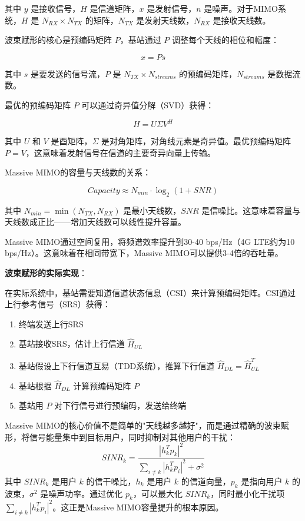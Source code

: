 其中 $y$ 是接收信号，$H$ 是信道矩阵，$x$ 是发射信号，$n$ 是噪声。对于MIMO系统，$H$ 是 $N_{RX} \times N_{TX}$ 的矩阵，$N_{TX}$ 是发射天线数，$N_{RX}$ 是接收天线数。

波束赋形的核心是预编码矩阵 $P$，基站通过 $P$ 调整每个天线的相位和幅度：

\begin{equation}
x = Ps
\end{equation}

其中 $s$ 是要发送的信号流，$P$ 是 $N_{TX} \times N_{streams}$ 的预编码矩阵，$N_{streams}$ 是数据流数。

最优的预编码矩阵 $P$ 可以通过奇异值分解（SVD）获得：

\begin{equation}
H = U\Sigma V^H
\end{equation}

其中 $U$ 和 $V$ 是酉矩阵，$\Sigma$ 是对角矩阵，对角线元素是奇异值。最优预编码矩阵 $P = V$，这意味着发射信号在信道的主要奇异向量上传输。

Massive MIMO的容量与天线数的关系：

\begin{equation}
Capacity \approx N_{min} \cdot \log_2(1 + SNR)
\end{equation}

其中 $N_{min} = \min(N_{TX}, N_{RX})$ 是最小天线数，$SNR$ 是信噪比。这意味着容量与天线数成正比——增加天线数可以线性提升容量。

Massive MIMO通过空间复用，将频谱效率提升到30-40 bps/Hz（4G LTE约为10 bps/Hz）。这意味着在相同带宽下，Massive MIMO可以提供3-4倍的吞吐量。

\textbf{波束赋形的实际实现}：

在实际系统中，基站需要知道信道状态信息（CSI）来计算预编码矩阵。CSI通过上行参考信号（SRS）获得：

\begin{enumerate}
    \item 终端发送上行SRS
    \item 基站接收SRS，估计上行信道 $\hat{H}_{UL}$
    \item 基站假设上下行信道互易（TDD系统），推算下行信道 $\hat{H}_{DL} = \hat{H}_{UL}^T$
    \item 基站根据 $\hat{H}_{DL}$ 计算预编码矩阵 $P$
    \item 基站用 $P$ 对下行信号进行预编码，发送给终端
\end{enumerate}

\begin{insightbox}
Massive MIMO的核心价值不是简单的"天线越多越好"，而是通过精确的波束赋形，将信号能量集中到目标用户，同时抑制对其他用户的干扰：
\begin{equation}
SINR_k = \frac{|h_k^T p_k|^2}{\sum_{i \neq k} |h_k^T p_i|^2 + \sigma^2}
\end{equation}
其中 $SINR_k$ 是用户 $k$ 的信干噪比，$h_k$ 是用户 $k$ 的信道向量，$p_k$ 是指向用户 $k$ 的波束，$\sigma^2$ 是噪声功率。通过优化 $p_k$，可以最大化 $SINR_k$，同时最小化干扰项 $\sum_{i \neq k} |h_k^T p_i|^2$。这正是Massive MIMO容量提升的根本原因。
\end{insightbox}

